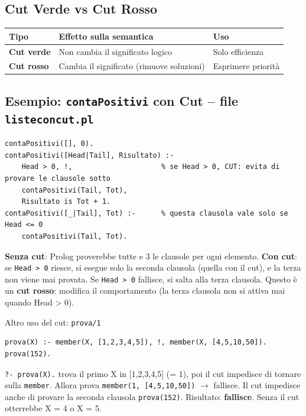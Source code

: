 \documentclass[12pt,a4paper]{article}
\begin{document}
\subsection{Cut Verde vs Cut Rosso}

\begin{center}
\begin{tabular}{lll}
\toprule
\textbf{Tipo} & \textbf{Effetto sulla semantica} & \textbf{Uso} \\
\midrule
\textbf{Cut verde} & Non cambia il significato logico & Solo efficienza \\
\textbf{Cut rosso} & Cambia il significato (rimuove soluzioni) & Esprimere priorità \\
\bottomrule
\end{tabular}
\end{center}

\subsection{Esempio: \texttt{contaPositivi} con Cut -- file \texttt{listeconcut.pl}}

\begin{lstlisting}
contaPositivi([], 0).
contaPositivi([Head|Tail], Risultato) :-
    Head > 0, !,                     % se Head > 0, CUT: evita di provare le clausole sotto
    contaPositivi(Tail, Tot),
    Risultato is Tot + 1.
contaPositivi([_|Tail], Tot) :-      % questa clausola vale solo se Head <= 0
    contaPositivi(Tail, Tot).
\end{lstlisting}

\textbf{Senza cut}: Prolog proverebbe tutte e 3 le clausole per ogni elemento.
\textbf{Con cut}: se \texttt{Head > 0} riesce, si esegue solo la seconda clausola
(quella con il cut), e la terza non viene mai provata. Se \texttt{Head > 0} fallisce,
si salta alla terza clausola. Questo è un \textbf{cut rosso}: modifica il
comportamento (la terza clausola non si attiva mai quando Head > 0).

\begin{exbox}{Altro uso del cut: \texttt{prova/1}}
\begin{lstlisting}
prova(X) :- member(X, [1,2,3,4,5]), !, member(X, [4,5,10,50]).
prova(152).
\end{lstlisting}
\texttt{?- prova(X).} trova il primo X in [1,2,3,4,5] (= 1), poi il cut impedisce
di tornare sulla \texttt{member}. Allora prova \texttt{member(1, [4,5,10,50])} $\to$
fallisce. Il cut impedisce anche di provare la seconda clausola \texttt{prova(152)}.
Risultato: \textbf{fallisce}. Senza il cut otterrebbe X = 4 o X = 5.
\end{exbox}
\end{document}
